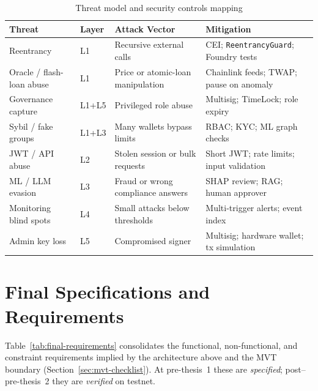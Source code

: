 \documentclass[12pt, a4paper]{report}
\newcommand{\tableheadcolor}{\rowcolor{TableHeadBg}}
\newcommand{\tableheadfont}{\bfseries}
\begin{document}
\begin{table}[H]
\centering
\caption[Threat model and security controls mapping]{Threat model and security controls mapping}
\label{tab:threat-model}
\footnotesize
\setlength{\tabcolsep}{4pt}
\begin{tabular}{@{}p{2.3cm}p{1.1cm}p{3.6cm}p{5.8cm}@{}}
\toprule
\tableheadcolor
\tableheadfont Threat & \tableheadfont Layer & \tableheadfont Attack Vector & \tableheadfont Mitigation \\
\midrule
Reentrancy & L1 & Recursive external calls & CEI; \texttt{ReentrancyGuard}; Foundry tests \\
\rowcolor{RowShade}
Oracle / flash-loan abuse & L1 & Price or atomic-loan manipulation & Chainlink feeds; TWAP; pause on anomaly \\
Governance capture & L1+L5 & Privileged role abuse & Multisig; TimeLock; role expiry \\
\rowcolor{RowShade}
Sybil / fake groups & L1+L3 & Many wallets bypass limits & RBAC; KYC; ML graph checks \\
JWT / API abuse & L2 & Stolen session or bulk requests & Short JWT; rate limits; input validation \\
\rowcolor{RowShade}
ML / LLM evasion & L3 & Fraud or wrong compliance answers & SHAP review; RAG; human approver \\
Monitoring blind spots & L4 & Small attacks below thresholds & Multi-trigger alerts; event index \\
\rowcolor{RowShade}
Admin key loss & L5 & Compromised signer & Multisig; hardware wallet; tx simulation \\
\bottomrule
\end{tabular}
\end{table}

\section{Final Specifications and Requirements}
\label{sec:final-specifications}

Table~\ref{tab:final-requirements} consolidates the functional, non-functional, and constraint requirements implied by the architecture above and the MVT boundary (Section~\ref{sec:mvt-checklist}). At pre-thesis~1 these are \textit{specified}; post--pre-thesis~2 they are \textit{verified} on testnet.
\end{document}

